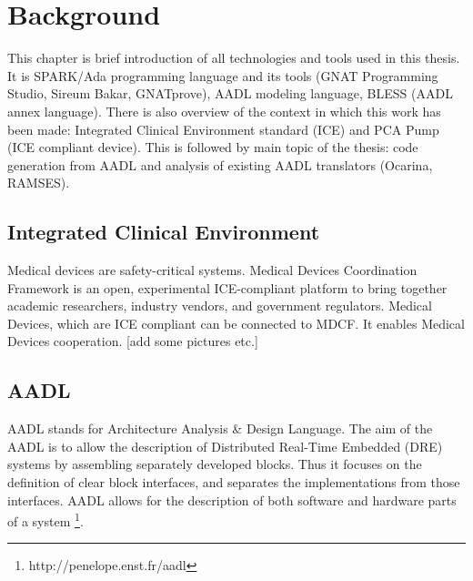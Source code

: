 
\cleardoublepage


\chapter{Background}
\label{background}

This chapter is brief introduction of all technologies and tools used in this thesis. It is SPARK/Ada programming language and its tools (GNAT Programming Studio, Sireum Bakar, GNATprove), AADL modeling language, BLESS (AADL annex language). There is also overview of the context in which this work has been made: Integrated Clinical Environment standard (ICE) and PCA Pump (ICE compliant device). This is followed by main topic of the thesis: code generation from AADL and analysis of existing AADL translators (Ocarina, RAMSES).



\section{Integrated Clinical Environment}
\label{background:ice}
Medical devices are safety-critical systems.
Medical Devices Coordination Framework is an open, experimental ICE-compliant platform to bring together academic researchers, industry vendors, and government regulators.
Medical Devices, which are ICE compliant can be connected to MDCF. It enables Medical Devices cooperation.
[add some pictures etc.]


\section{AADL}
\label{background:aadl}

AADL stands for Architecture Analysis \& Design Language. The aim of the AADL is to allow the description of Distributed Real-Time Embedded (DRE) systems by assembling separately developed blocks. Thus it focuses on the definition of clear block interfaces, and separates the implementations from those interfaces. AADL allows for the description of both software and hardware parts of a system \footnote{http://penelope.enst.fr/aadl}. 

